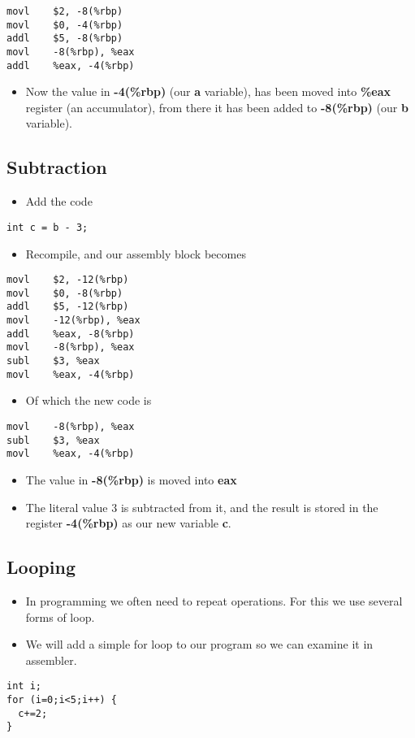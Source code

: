 \documentclass[minimal, t]{article}
\begin{document}
\begin{verbatim}
movl    $2, -8(%rbp)
movl    $0, -4(%rbp)
addl    $5, -8(%rbp)
movl    -8(%rbp), %eax
addl    %eax, -4(%rbp)
\end{verbatim}
\begin{itemize}
\item Now the value in \textbf{-4(\%rbp)} (our \textbf{a} variable), has been moved into
\textbf{\%eax} register (an accumulator), from there it has been added to \textbf{-8(\%rbp)}
(our \textbf{b} variable).
\end{itemize}
\subsection{Subtraction}
\label{sec-1-1}
\begin{itemize}
\item Add the code
\end{itemize}
\begin{verbatim}
int c = b - 3;
\end{verbatim}
\begin{itemize}
\item Recompile, and our assembly block becomes
\end{itemize}
\begin{verbatim}
movl    $2, -12(%rbp)
movl    $0, -8(%rbp)
addl    $5, -12(%rbp)
movl    -12(%rbp), %eax
addl    %eax, -8(%rbp)
movl    -8(%rbp), %eax
subl    $3, %eax
movl    %eax, -4(%rbp)
\end{verbatim}
\begin{itemize}
\item Of which the new code is
\end{itemize}
\begin{verbatim}
movl    -8(%rbp), %eax
subl    $3, %eax
movl    %eax, -4(%rbp)
\end{verbatim}
\begin{itemize}
\item The value in \textbf{-8(\%rbp)} is moved into \textbf{eax}
\item The literal value 3 is subtracted from it, and the result is stored
in the register \textbf{-4(\%rbp)} as our new variable \textbf{c}.
\end{itemize}
\subsection{Looping}
\label{sec-1-2}
\begin{itemize}
\item In programming we often need to repeat operations. For this we use
several forms of loop.
\item We will add a simple for loop to our program so we can examine it
in assembler.
\end{itemize}
\begin{verbatim}
int i;                                                                                                    
for (i=0;i<5;i++) {                                      
  c+=2;                                       
}
\end{verbatim}
\end{document}
